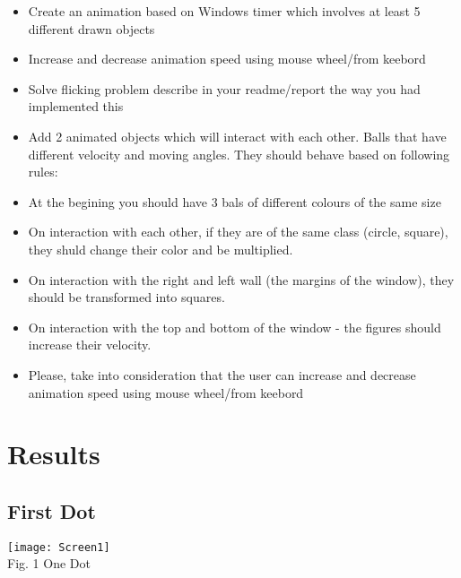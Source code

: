 \documentclass[12pt]{article}
\begin{document}
  \begin{itemize}
    \renewcommand{\labelitemi}{$\circ$}
  \item Create an animation based on Windows timer which involves at least 5 different drawn objects

 \item Increase and decrease animation speed using mouse wheel/from keebord
 \item Solve flicking problem describe in your readme/report the way you had implemented this

 \item Add 2 animated objects which will interact with each other. Balls that have different velocity and moving angles. They should behave based on following rules:
 \item At the begining you should have 3 bals of different colours of the same size
 \item On interaction with each other, if they are of the same class (circle, square), they shuld change their color and be multiplied.
 \item On interaction with the right and left wall (the margins of the window), they should be transformed into squares.
 \item On interaction with the top and bottom of the window - the figures should increase their velocity.
 \item Please, take into consideration that the user can increase and decrease animation speed using mouse wheel/from keebord
  \end{itemize}


  \section{Results}




\subsection{First Dot}
\begin{minipage}[b]{1.0\linewidth}
      \begin{center}
        \texttt{[image: Screen1]}
         \\ Fig. 1 One Dot
      \end{center}
    \end{minipage}
\end{document}
